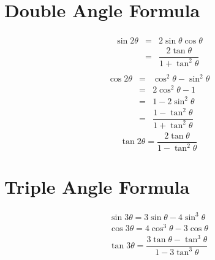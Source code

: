 \section{Double Angle Formula}
\begin{equation}
	\begin{aligned}
		\begin{split}
			\sin 2\theta &=& 2\sin \theta \cos \theta\\
			&=&\dfrac{2 \tan \theta}{1+\tan^2 \theta}
		\end{split}
	\end{aligned}
\end{equation}
\begin{equation}
	\begin{aligned}
		\begin{split}
			\cos 2\theta &=& \cos^2 \theta -\sin^2 \theta\\
			&=&2\cos^2 \theta-1\\
			&=&1-2\sin^2 \theta\\
			&=&\dfrac{1-\tan^2 \theta}{1+\tan^2 \theta}
		\end{split}
	\end{aligned}
\end{equation}
\begin{equation}
	\tan 2\theta=\dfrac{2 \tan \theta}{1-\tan^2 \theta}
\end{equation}

\section{Triple Angle Formula}
\begin{align}
	\sin 3\theta=3\sin \theta-4 \sin^3 \theta\\
	\cos 3\theta=4\cos^3 \theta-3 \cos \theta\\
	\tan 3\theta=\dfrac{3\tan \theta -\tan^3 \theta}{1-3\tan^3 \theta}
\end{align}

